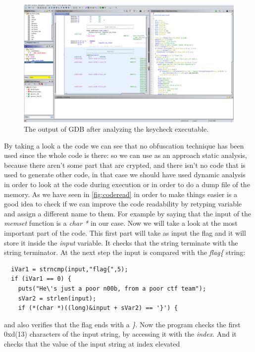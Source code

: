 \documentclass{article}
\begin{document}
\begin{figure}[htp]
    \centering
    \includegraphics[width=1\textwidth]{images/ghidrakeycheck.png}
    \caption{The output of GDB after analyzing the keycheck executable.}
    \label{fig:keycheckgdb}
\end{figure}
By taking a look a the code we can see that no obfuscation technique has been used since the whole code is there: so we can use as an approach static analysis, because there aren't some part that are crypted, and there isn't no code that is used to generate other code, in that case we should have used dynamic analysis
in order to look at the code during execution or in order to do a dump file of the memory.
As we have seen in \ref{fig:coderead} in order to make things easier is a good idea to check if we can improve the code readability by retyping variable and assign a different name to them.
For example by saying that the input of the \textit{memset} function is a \textit{char *} in our case.
Now we will take a look at the most important part of the code.
This first part will take as input the flag and it will store it inside the \textit{input} variable. It checks that the string terminate with the string terminator.
At the next step the input is compared with the \textit{flag\{} string:
\begin{verbatim}
  iVar1 = strncmp(input,"flag{",5);
  if (iVar1 == 0) {
    puts("He\'s just a poor n00b, from a poor ctf team");
    sVar2 = strlen(input);
    if (*(char *)((long)&input + sVar2) == '}') {
\end{verbatim}
and also verifies that the flag ends with a \textit{\}}.
Now the program checks the first 0xd(13) characters of the input string, by accessing it with the \textit{index}. And it checks that the value of the input string at index elevated
\end{document}
